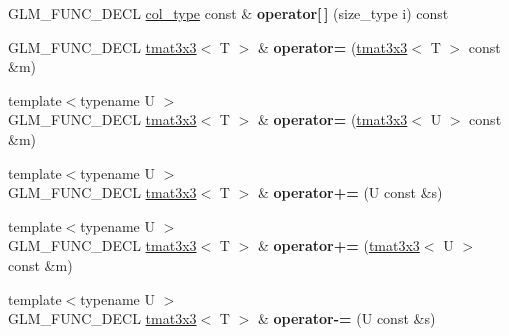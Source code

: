 \begin{DoxyCompactItemize}
\item 
\hypertarget{structglm_1_1detail_1_1tmat3x3_acc2d48e3c3179a904bd5de651871c216}{}G\+L\+M\+\_\+\+F\+U\+N\+C\+\_\+\+D\+E\+C\+L \hyperlink{structglm_1_1detail_1_1tvec3}{col\+\_\+type} const \& {\bfseries operator\mbox{[}$\,$\mbox{]}} (size\+\_\+type i) const \label{structglm_1_1detail_1_1tmat3x3_acc2d48e3c3179a904bd5de651871c216}

\item 
\hypertarget{structglm_1_1detail_1_1tmat3x3_ab0b2468efadce20e29801a4c604b74ed}{}G\+L\+M\+\_\+\+F\+U\+N\+C\+\_\+\+D\+E\+C\+L \hyperlink{structglm_1_1detail_1_1tmat3x3}{tmat3x3}$<$ T $>$ \& {\bfseries operator=} (\hyperlink{structglm_1_1detail_1_1tmat3x3}{tmat3x3}$<$ T $>$ const \&m)\label{structglm_1_1detail_1_1tmat3x3_ab0b2468efadce20e29801a4c604b74ed}

\item 
\hypertarget{structglm_1_1detail_1_1tmat3x3_af9fbbe1e38ba72329be511e3f196d8a6}{}{\footnotesize template$<$typename U $>$ }\\G\+L\+M\+\_\+\+F\+U\+N\+C\+\_\+\+D\+E\+C\+L \hyperlink{structglm_1_1detail_1_1tmat3x3}{tmat3x3}$<$ T $>$ \& {\bfseries operator=} (\hyperlink{structglm_1_1detail_1_1tmat3x3}{tmat3x3}$<$ U $>$ const \&m)\label{structglm_1_1detail_1_1tmat3x3_af9fbbe1e38ba72329be511e3f196d8a6}

\item 
\hypertarget{structglm_1_1detail_1_1tmat3x3_a377ac0fd8b02b5f1b6d8b4284802fcb1}{}{\footnotesize template$<$typename U $>$ }\\G\+L\+M\+\_\+\+F\+U\+N\+C\+\_\+\+D\+E\+C\+L \hyperlink{structglm_1_1detail_1_1tmat3x3}{tmat3x3}$<$ T $>$ \& {\bfseries operator+=} (U const \&s)\label{structglm_1_1detail_1_1tmat3x3_a377ac0fd8b02b5f1b6d8b4284802fcb1}

\item 
\hypertarget{structglm_1_1detail_1_1tmat3x3_a3d7dc7caf2167cf9a671eaa5032138e0}{}{\footnotesize template$<$typename U $>$ }\\G\+L\+M\+\_\+\+F\+U\+N\+C\+\_\+\+D\+E\+C\+L \hyperlink{structglm_1_1detail_1_1tmat3x3}{tmat3x3}$<$ T $>$ \& {\bfseries operator+=} (\hyperlink{structglm_1_1detail_1_1tmat3x3}{tmat3x3}$<$ U $>$ const \&m)\label{structglm_1_1detail_1_1tmat3x3_a3d7dc7caf2167cf9a671eaa5032138e0}

\item 
\hypertarget{structglm_1_1detail_1_1tmat3x3_a8636caa88fa286fa0152acdba0e19884}{}{\footnotesize template$<$typename U $>$ }\\G\+L\+M\+\_\+\+F\+U\+N\+C\+\_\+\+D\+E\+C\+L \hyperlink{structglm_1_1detail_1_1tmat3x3}{tmat3x3}$<$ T $>$ \& {\bfseries operator-\/=} (U const \&s)\label{structglm_1_1detail_1_1tmat3x3_a8636caa88fa286fa0152acdba0e19884}


\end{DoxyCompactItemize}
